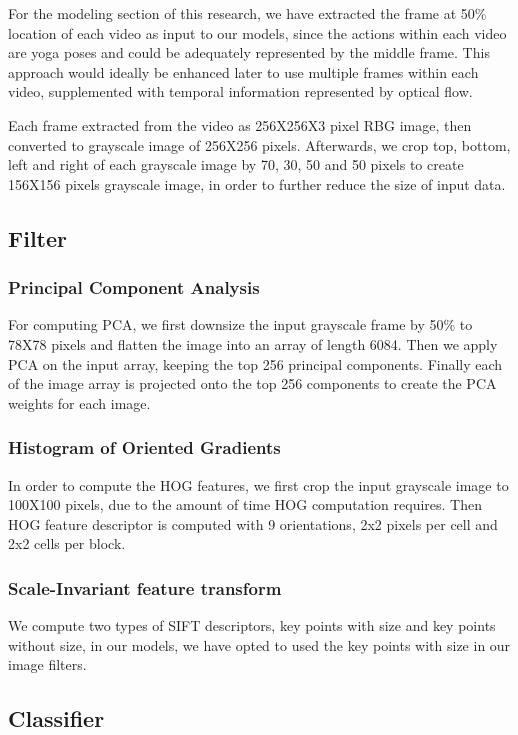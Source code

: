\documentclass[
	a4paper, %
	10pt, %
	unnumberedsections, %
	twoside, %
]{t0004}
\begin{document}
For the modeling section of this research, we have extracted the frame at 50\% location of each video as input to our models, since the actions within each video are yoga poses and could be adequately represented by the middle frame. This approach would ideally be enhanced later to use multiple frames within each video, supplemented with temporal information represented by optical flow.

Each frame extracted from the video as 256X256X3 pixel RBG image, then converted to grayscale image of 256X256 pixels. Afterwards, we crop top, bottom, left and right of each grayscale image by 70, 30, 50 and 50 pixels to create 156X156 pixels grayscale image, in order to further reduce the size of input data.

\subsection{Filter}

\subsubsection{Principal Component Analysis} For computing PCA, we first downsize the input grayscale frame by 50\% to 78X78 pixels and flatten the image into an array of length 6084. Then we apply PCA on the input array, keeping the top 256 principal components. Finally each of the image array is projected onto the top 256 components to create the PCA weights for each image.

\subsubsection{Histogram of Oriented Gradients} In order to compute the HOG features, we first crop the input grayscale image to 100X100 pixels, due to the amount of time HOG computation requires. Then HOG feature descriptor is computed with 9 orientations, 2x2 pixels per cell and 2x2 cells per block.

\subsubsection{Scale-Invariant feature transform} We compute two types of SIFT descriptors, key points with size and key points without size, in our models, we have opted to used the key points with size in our image filters.

\subsection{Classifier}
\end{document}
